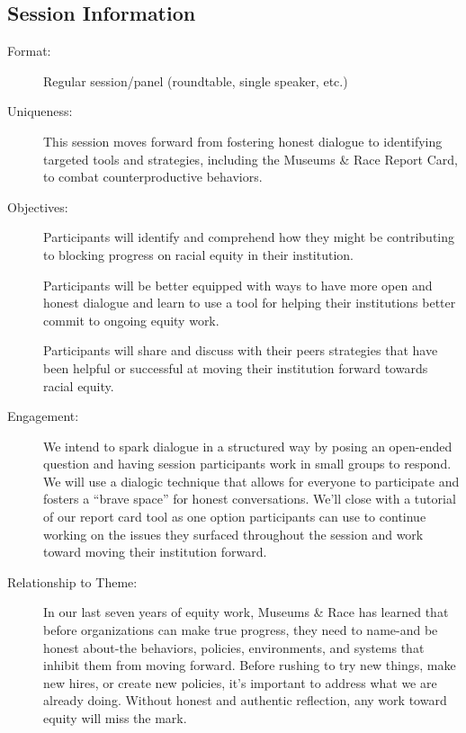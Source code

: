 \documentclass{report}
\begin{document}
              \subsection*{Session Information}
                \begin{description}
                  \item [Format:] Regular session/panel (roundtable, single speaker, etc.)
							    
							    \item [Uniqueness:]This session moves forward from fostering honest dialogue to identifying targeted tools and strategies, including the Museums & Race Report Card, to combat counterproductive behaviors.
							    \item [Objectives:]Participants will identify and comprehend how they might be contributing to blocking progress on racial equity in their institution.

Participants will be better equipped with ways to have more open and honest dialogue and learn to use a tool for helping their institutions better commit to ongoing equity work. 

Participants will share and discuss with their peers strategies that have been helpful or successful at moving their institution forward towards racial equity.
							    \item [Engagement:]We intend to spark dialogue in a structured way by posing an open-ended question and having session participants work in small groups to respond. We will use a dialogic technique that allows for everyone to participate and fosters a “brave space” for honest conversations. We’ll close with a tutorial of our report card tool as one option participants can use to continue working on the issues they surfaced throughout the session and work toward moving their institution forward.
							    \item [Relationship to Theme:]In our last seven years of equity work, Museums \& Race has learned that before organizations can make true progress, they need to name-and be honest about-the behaviors, policies, environments, and systems that inhibit them from moving forward. Before rushing to try new things, make new hires, or create new policies, it’s important to address what we are already doing. Without honest and authentic reflection, any work toward equity will miss the mark.
							    
                \end{description}
\end{document}
